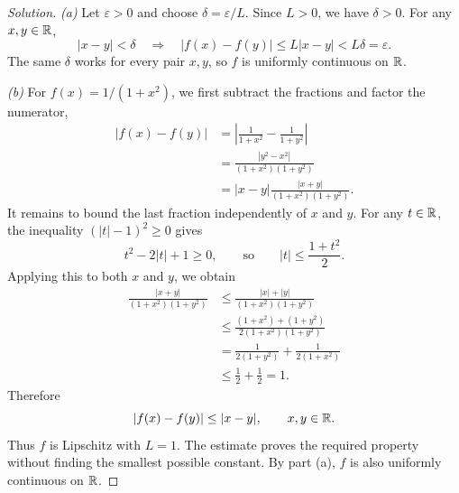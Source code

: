 \begin{proof}[Solution]
  \textit{(a)} Let $\varepsilon>0$ and choose $\delta=\varepsilon/L$.
  Since $L>0$, we have $\delta>0$. For any $x,y\in\mathbb{R}$,
  \[
    |x-y|<\delta
      \quad\Longrightarrow\quad
      |f(x)-f(y)|\le L|x-y|<L\delta=\varepsilon.
  \]
  The same $\delta$ works for every pair $x,y$, so $f$ is uniformly
  continuous on $\mathbb{R}$.

  \textit{(b)} For $f(x)=1/(1+x^2)$, we first subtract the fractions
  and factor the numerator,
  \begin{align*}
    |f(x)-f(y)|
      &=\left|\frac{1}{1+x^2}-\frac{1}{1+y^2}\right|\\
      &=\frac{|y^2-x^2|}{(1+x^2)(1+y^2)}\\
      &=|x-y|\frac{|x+y|}{(1+x^2)(1+y^2)}.
  \end{align*}
  It remains to bound the last fraction independently of $x$ and $y$.
  For any $t\in\mathbb{R}$, the inequality $(|t|-1)^2\ge0$ gives
  \[
    t^2-2|t|+1\ge0,
    \qquad\text{so}\qquad |t|\le\frac{1+t^2}{2}.
  \]
  Applying this to both $x$ and $y$, we obtain
  \begin{align*}
    \frac{|x+y|}{(1+x^2)(1+y^2)}
      &\le\frac{|x|+|y|}{(1+x^2)(1+y^2)}\\
      &\le\frac{(1+x^2)+(1+y^2)}{2(1+x^2)(1+y^2)}\\
      &=\frac{1}{2(1+y^2)}+\frac{1}{2(1+x^2)}\\
      &\le\frac12+\frac12=1.
  \end{align*}
  Therefore
  \[
    |f(x)-f(y)|\le |x-y|,\qquad x,y\in\mathbb{R}.
  \]
  Thus $f$ is Lipschitz with $L=1$. The estimate
  proves the required property without finding the smallest possible
  constant. By part (a), $f$ is also
  uniformly continuous on $\mathbb{R}$.
\end{proof}
